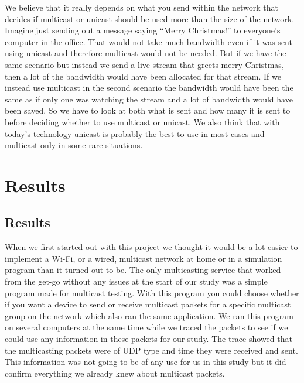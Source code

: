\documentclass[9pt,a4paper]{acmproc}
\begin{document}
We believe that it really depends on what you send within the network that decides if multicast or unicast should be used more than the size of the network. Imagine just sending out a message saying “Merry Christmas!” to everyone's computer in the office. That would not take much bandwidth even if it was sent using unicast and therefore multicast would not be needed. But if we have the same scenario but instead we send a live stream that greets merry Christmas, then a lot of the bandwidth would have been allocated for that stream. If we instead use multicast in the second scenario the bandwidth would have been the same as if only one was watching the stream and a lot of bandwidth would have been saved. So we have to look at both what is sent and how many it is sent to before deciding whether to use multicast or unicast. We also think that with today's technology unicast is probably the best to use in most cases and multicast only in some rare situations. \cite{multExplained} \cite{whatIsMult} \cite{understandIpMult} 


\clearpage

\section{Results}

\subsection{Results}

When we first started out with this project we thought it would be a lot easier to implement a Wi-Fi, or a wired, multicast network at home or in a simulation program than it turned out to be. The only multicasting service that worked from the get-go without any issues at the start of our study was a simple program made for multicast testing. With this program you could choose whether if you want a device to send or receive multicast packets for a specific multicast group on the network which also ran the same application. We ran this program on several computers at the same time while we traced the packets to see if we could use any information in these packets for our study. The trace showed that the multicasting packets were of UDP type and time they were received and sent. This information was not going to be of any use for us in this study but it did confirm everything we already knew about multicast packets.
\end{document}
